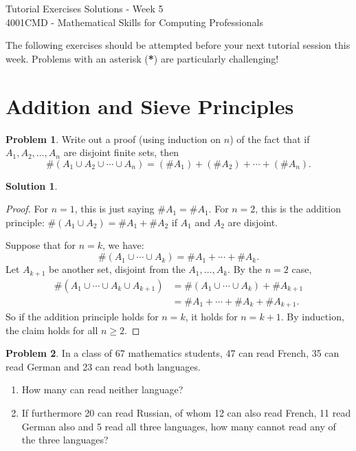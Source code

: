 \documentclass{article}
\numberwithin{equation}{section}
\theoremstyle{plain}
\theoremstyle{definition}
\newtheorem{problem}{Problem}
\newtheorem*{solution*}{Solution}
\begin{document}
\begin{center}
\Large{Tutorial Exercises Solutions - Week 5} \\
\vspace{3mm}
\large{4001CMD - Mathematical Skills for Computing Professionals} \\
\vspace{5mm}
\end{center}


The following exercises should be attempted before your next tutorial session this week. Problems with an asterisk (\textbf{*}) are particularly challenging! 

\section*{Addition and Sieve Principles}

\begin{problem}
	Write out a proof (using induction on $n$) of the fact that if $A_1, A_2, \ldots, A_n$ are disjoint finite sets, then \[
	\#\left(A_1 \cup A_2 \cup \cdots \cup A_n\right) = (\#A_1) + (\#A_2) + \cdots + (\#A_n).
	\]
\end{problem}

\begin{solution*}
	\begin{proof}
		For $n=1$, this is just saying $\#A_1 = \#A_1$. For $n=2$, this is the addition principle: $\#(A_1 \cup A_2) = \#A_1 + \#A_2$ if $A_1$ and $A_2$ are disjoint. 
		
		Suppose that for $n=k$, we have: 
		\[
		\#(A_1 \cup \cdots \cup A_k) = \#A_1 + \cdots + \#A_k.
		\]
		Let $A_{k+1}$ be another set, disjoint from the $A_1, \ldots, A_k$. By the $n=2$ case, 
		\begin{align*}
		\#\left(A_1 \cup \cdots \cup A_k \cup A_{k+1}\right) &= \#\left(A_1 \cup \cdots \cup A_k\right)+ \#A_{k+1} \\
		&= \#A_1 + \cdots + \#A_k + \#A_{k+1}. 
		\end{align*}
		So if the addition principle holds for $n=k$, it holds for $n=k+1$. By induction, the claim holds for all $n \geq 2$. 
	\end{proof}
\end{solution*}

\begin{problem}
	In a class of 67 mathematics students, 47 can read French, 35 can read German and 23 can read both languages.
	\begin{enumerate}[label=(\alph*)]
		\item How many can read neither language? 
		\item If furthermore 20 can read Russian, of whom 12 can also read French, 11 read German also and 5 read all three languages, how many cannot read any of the three languages? 
	\end{enumerate}
\end{problem}
\end{document}
